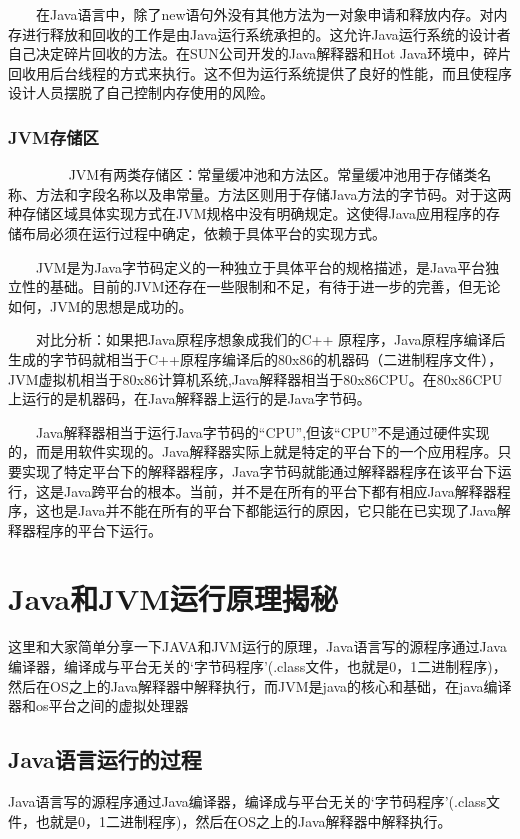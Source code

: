 \documentclass[10pt,b5paper]{article}
\begin{document}
　　在Java语言中，除了new语句外没有其他方法为一对象申请和释放内存。对内存进行释放和回收的工作是由Java运行系统承担的。这允许Java运行系统的设计者自己决定碎片回收的方法。在SUN公司开发的Java解释器和Hot Java环境中，碎片回收用后台线程的方式来执行。这不但为运行系统提供了良好的性能，而且使程序设计人员摆脱了自己控制内存使用的风险。 
　　 

\subsubsection{JVM存储区}
\label{sec-1-2-5}
　　 
　　JVM有两类存储区：常量缓冲池和方法区。常量缓冲池用于存储类名称、方法和字段名称以及串常量。方法区则用于存储Java方法的字节码。对于这两种存储区域具体实现方式在JVM规格中没有明确规定。这使得Java应用程序的存储布局必须在运行过程中确定，依赖于具体平台的实现方式。 

　　JVM是为Java字节码定义的一种独立于具体平台的规格描述，是Java平台独立性的基础。目前的JVM还存在一些限制和不足，有待于进一步的完善，但无论如何，JVM的思想是成功的。 

　　对比分析：如果把Java原程序想象成我们的C++ 原程序，Java原程序编译后生成的字节码就相当于C++原程序编译后的80x86的机器码（二进制程序文件），JVM虚拟机相当于80x86计算机系统,Java解释器相当于80x86CPU。在80x86CPU上运行的是机器码，在Java解释器上运行的是Java字节码。 

　　Java解释器相当于运行Java字节码的“CPU”,但该“CPU”不是通过硬件实现的，而是用软件实现的。Java解释器实际上就是特定的平台下的一个应用程序。只要实现了特定平台下的解释器程序，Java字节码就能通过解释器程序在该平台下运行，这是Java跨平台的根本。当前，并不是在所有的平台下都有相应Java解释器程序，这也是Java并不能在所有的平台下都能运行的原因，它只能在已实现了Java解释器程序的平台下运行。 
\section{Java和JVM运行原理揭秘}
\label{sec-2}
这里和大家简单分享一下JAVA和JVM运行的原理，Java语言写的源程序通过Java编译器，编译成与平台无关的‘字节码程序’(.class文件，也就是0，1二进制程序)，然后在OS之上的Java解释器中解释执行，而JVM是java的核心和基础，在java编译器和os平台之间的虚拟处理器
\subsection{Java语言运行的过程}
\label{sec-2-1}

Java语言写的源程序通过Java编译器，编译成与平台无关的‘字节码程序’(.class文件，也就是0，1二进制程序)，然后在OS之上的Java解释器中解释执行。
\end{document}
